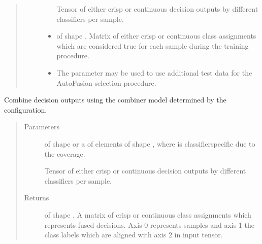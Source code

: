 \documentclass[letterpaper,10pt,english]{sphinxmanual}
\begin{document}
\begin{fulllineitems}
\begin{fulllineitems}
\begin{quote}
\begin{description}
\begin{itemize}
\sphinxAtStartPar
Tensor of either crisp or continuous decision outputs by different classifiers per sample.


\item {} 
\sphinxAtStartPar
{} \textendash{}  of shape .
Matrix of either crisp or continuous class assignments which are considered true for each sample during
the training procedure.

\item {} 
\sphinxAtStartPar
{} \textendash{} The  parameter may be used to use additional test data for the AutoFusion selection
procedure.

\end{itemize}

\end{description}\end{quote}

\end{fulllineitems}


\begin{fulllineitems}
\label{\detokenize{pusion.control.decision_processor:pusion.control.decision_processor.DecisionProcessor.combine}}
\sphinxAtStartPar
Combine decision outputs using the combiner model determined by the configuration.
\begin{quote}\begin{description}
\item[{Parameters}] \leavevmode
\sphinxAtStartPar
{} \textendash{} 
\sphinxAtStartPar
{} of shape  or a  of
 elements of shape , where  is classifier\sphinxhyphen{}specific
due to the coverage.

\sphinxAtStartPar
Tensor of either crisp or continuous decision outputs by different classifiers per sample.


\item[{Returns}] \leavevmode
\sphinxAtStartPar
{} of shape . A matrix of crisp or continuous class assignments
which represents fused decisions. Axis 0 represents samples and axis 1 the class labels which are
aligned with axis 2 in  input tensor.


\end{description}
\end{quote}
\end{fulllineitems}
\end{fulllineitems}
\end{document}
